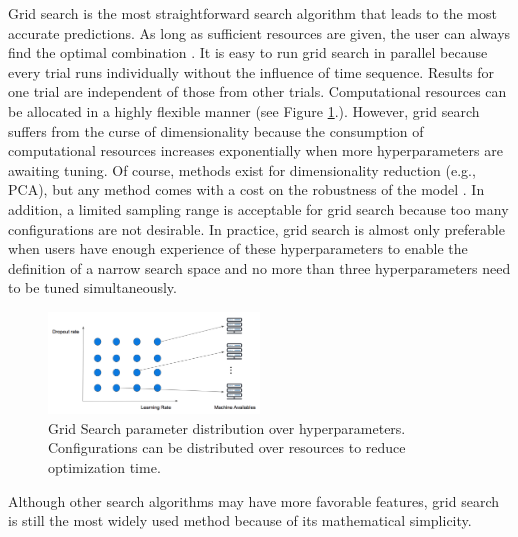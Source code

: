 \documentclass[conference]{IEEEtran}
\begin{document}
Grid search is the most straightforward search algorithm that leads to the most accurate predictions. As long as sufficient resources are given, the user can always find the optimal combination \cite{grid_search_tds}. It is easy to run grid search in parallel because every trial runs individually without the influence of time sequence. Results for one trial are independent of those from other trials. Computational resources can be allocated in a highly flexible manner (see Figure \ref{grid}.). However, grid search suffers from the curse of dimensionality because the consumption of computational resources increases exponentially when more hyperparameters are awaiting tuning. Of course, methods exist for dimensionality reduction (e.g., PCA), but any method comes with a cost on the robustness of the model \cite{grid_search_tds_sec}. In addition, a limited sampling range is acceptable for grid search because too many configurations are not desirable. In practice, grid search is almost only preferable when users have enough experience of these hyperparameters to enable the definition of a narrow search space and no more than three hyperparameters need to be tuned simultaneously. \cite{yu2020hyperparameter}

\begin{figure}[htbp]
\centerline{\includegraphics[width=0.5\textwidth]{grid.png}}
\caption{Grid Search parameter distribution over hyperparameters. \cite{grid_search} Configurations can be distributed over resources to reduce optimization time.}
\label{grid}
\end{figure}

Although other search algorithms may have more favorable features, grid search is still the most widely used method because of its mathematical simplicity. \cite{10.5555/2188385.2188395} \cite{yu2020hyperparameter}
\end{document}
